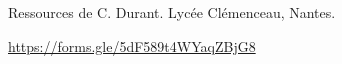 Ressources de C. Durant. Lycée Clémenceau, Nantes.
\begin{center}
\end{center}

\url{https://forms.gle/5dF589t4WYaqZBjG8}
